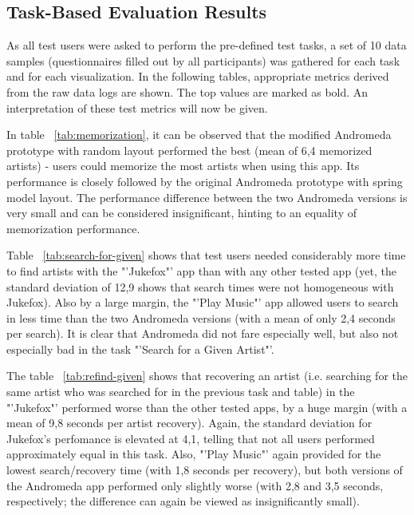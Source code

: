 \subsection{Task-Based Evaluation Results}
\label{sec:taskbased-evaluation-results}

As all test users were asked to perform the pre-defined test tasks, a set of 10 data samples (questionnaires filled out by all participants) was gathered for each task and for each visualization. In the following tables, appropriate metrics derived from the raw data logs are shown. The top values are marked as bold. An interpretation of these test metrics will now be given. 

In table ~\ref{tab:memorization}, it can be observed that the modified Andromeda prototype with random layout performed the best (mean of 6,4 memorized artists) - users could memorize the most artists when using this app. Its performance is closely followed by the original Andromeda prototype with spring model layout. The performance difference between the two Andromeda versions is very small and can be considered insignificant, hinting to an equality of memorization performance.

Table ~\ref{tab:search-for-given} shows that test users needed considerably more time to find artists with the  "'Jukefox"' app than with any other tested app (yet, the standard deviation of 12,9 shows that search times were not homogeneous with Jukefox). Also by a large margin, the "'Play Music"' app allowed users to search in less time than the two Andromeda versions (with a mean of only 2,4 seconds per search). It is clear that Andromeda did not fare especially well, but also not especially bad in the task "'Search for a Given Artist"'.

The table ~\ref{tab:refind-given} shows that recovering an artist (i.e. searching for the same artist who was searched for in the previous task and table) in the "'Jukefox"' performed worse than the other tested apps, by a huge margin (with a mean of 9,8 seconds per artist recovery). Again, the standard deviation for Jukefox's perfomance is elevated at 4,1, telling that not all users performed approximately equal in this task. Also, "'Play Music"' again provided for the lowest search/recovery time (with 1,8 seconds per recovery), but both versions of the Andromeda app performed only slightly worse (with 2,8 and 3,5 seconds, respectively; the difference can again be viewed as insignificantly small).

